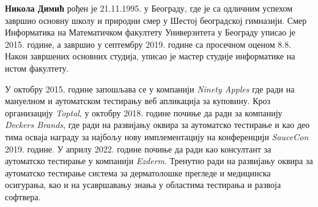 \documentclass[12pt,oneside]{memoir}
\begin{document}
\begin{biografija}
\textbf{Никола Димић} рођен је 21.11.1995. у Београду, где је са одличним успехом завршио основну школу и природни смер у Шестој београдској гимназији. Смер Информатика на Математичком факултету Универзитета у Београду уписао је 2015. године, а завршио у септембру 2019. године са просечном оценом 8.8. Након завршених основних студија, уписао је мастер студије информатике на истом факултету.

У октобру 2015. године запошљава се у компанији \textit{Ninety Apples} где ради на мануелном и аутоматском тестирању веб апликација за куповину. Кроз организацију \textit{Toptal}, у октобру 2018. године почиње да ради за компанију \textit{Deckers Brands}, где ради на развијању оквира за аутоматско тестирање и као део тима осваја награду за најбољу нову имплементацију на конференцији \textit{SauceCon} 2019. године. У априлу 2022. године почиње да ради као консултант за аутоматско тестирање у компанији \textit{Ezderm}. Тренутно ради на развијању оквира за аутоматско тестирање система за дерматолошке прегледе и медицинска осигурања, као и на усавршавању знања у областима тестирања и развоја софтвера.


\end{biografija}
\end{document}
